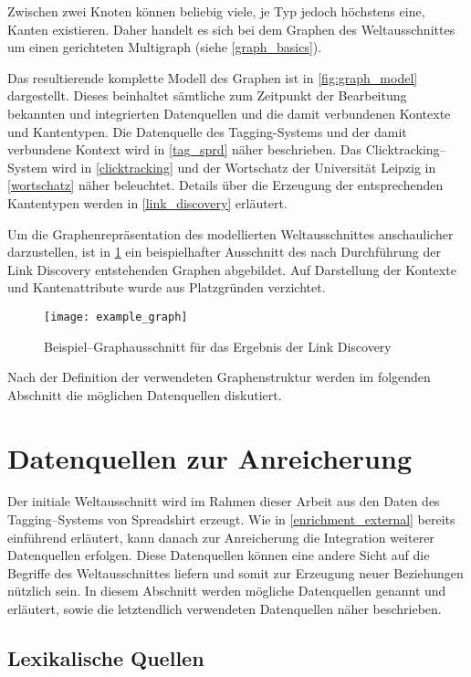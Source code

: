 Zwischen zwei Knoten können beliebig viele, je Typ jedoch höchstens eine, Kanten existieren. Daher handelt es sich bei dem Graphen des Weltausschnittes um einen gerichteten Multigraph (siehe \cref{graph_basics}).

Das resultierende komplette Modell des Graphen ist in \cref{fig:graph_model} dargestellt. Dieses beinhaltet sämtliche zum Zeitpunkt der Bearbeitung bekannten und integrierten Datenquellen und die damit verbundenen Kontexte und Kantentypen. Die Datenquelle des Tagging-Systems und der damit verbundene Kontext wird in \cref{tag_sprd} näher beschrieben. Das Clicktracking--System wird in \cref{clicktracking} und der Wortschatz der Universität Leipzig in \cref{wortschatz} näher beleuchtet. Details über die Erzeugung der entsprechenden Kantentypen werden in \cref{link_discovery} erläutert.

Um die Graphenrepräsentation des modellierten Weltausschnittes anschaulicher darzustellen, ist in \cref{fig:example_graph} ein beispielhafter Ausschnitt des nach Durchführung der Link Discovery entstehenden Graphen abgebildet. Auf Darstellung der Kontexte und Kantenattribute wurde aus Platzgründen verzichtet.

\begin{figure}
\centering
\texttt{[image: example\_graph]}
\caption{Beispiel--Graphausschnitt für das Ergebnis der Link Discovery}
\label{fig:example_graph}
\end{figure}

Nach der Definition der verwendeten Graphenstruktur werden im folgenden Abschnitt die möglichen Datenquellen diskutiert.

\section{Datenquellen zur Anreicherung}
\label{data_sources}

Der initiale Weltausschnitt wird im Rahmen dieser Arbeit aus den Daten des Tagging--Systems von Spreadshirt erzeugt. Wie in \cref{enrichment_external} bereits einführend erläutert, kann danach zur Anreicherung die Integration weiterer Datenquellen erfolgen. Diese Datenquellen können eine andere Sicht auf die Begriffe des Weltausschnittes liefern und somit zur Erzeugung neuer Beziehungen nützlich sein. In diesem Abschnitt werden mögliche Datenquellen genannt und erläutert, sowie die letztendlich verwendeten Datenquellen näher beschrieben.

\subsection{Lexikalische Quellen}
\label{lexical_sources}

